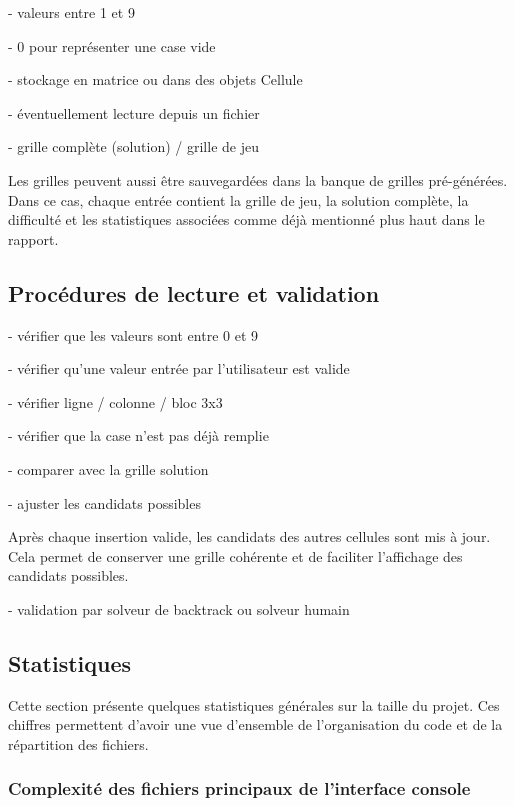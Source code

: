 \documentclass[a4paper]{article}
\begin{document}
- valeurs entre 1 et 9

- 0 pour représenter une case vide

- stockage en matrice ou dans des objets Cellule

- éventuellement lecture depuis un fichier

- grille complète (solution) / grille de jeu 

Les grilles peuvent aussi être sauvegardées dans la banque de grilles pré-générées. 
Dans ce cas, chaque entrée contient la grille de jeu, la solution complète, la difficulté et les statistiques associées comme déjà mentionné plus haut dans le rapport.

\subsection{Procédures de lecture et validation}
- vérifier que les valeurs sont entre 0 et 9

- vérifier qu’une valeur entrée par l’utilisateur est valide

- vérifier ligne / colonne / bloc 3x3

- vérifier que la case n’est pas déjà remplie

- comparer avec la grille solution

- ajuster les candidats possibles

Après chaque insertion valide, les candidats des autres cellules sont mis à jour. Cela permet de conserver une grille cohérente et de faciliter l'affichage des candidats possibles.

- validation par solveur de backtrack ou solveur humain


\subsection{Statistiques}

Cette section présente quelques statistiques générales sur la taille du projet. Ces chiffres permettent d'avoir une vue d'ensemble de l'organisation du code et de la répartition des fichiers.

\subsubsection{Complexité des fichiers principaux de l'interface console}
\end{document}
